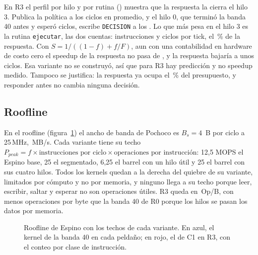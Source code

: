 \begin{table}[H]\centering
\caption{Speedup predicho por Amdahl contra el medido, con la banda 40.}\label{tab:amdahl}

\end{table}

En R3 el perfil por hilo y por rutina () muestra que la respuesta la cierra el hilo 3. Publica la política a los \ctresHitoPolProm{} ciclos en promedio, y el hilo 0, que terminó la banda 40 antes y esperó \ctresEsperaHiloCero{} ciclos, escribe \texttt{DECISION} a los \ctresHitoDecProm. Lo que más pesa en el hilo 3 es la rutina \texttt{ejecutar}, las dos cuentas: \ctresEjecutarIc{} instrucciones y \ctresEjecutarCiclos{} ciclos por tick, el \ctresAmdahlF\,\% de la respuesta. Con $S = 1/((1-f) + f/F)$, aun con una contabilidad en hardware de costo cero el speedup de la respuesta no pasa de \ctresAmdahlSmax, y la respuesta bajaría a unos \ctresAmdahlRespMin{} ciclos. Esa variante no se construyó, así que para R3 hay predicción y no speedup medido. Tampoco se justifica: la respuesta ya ocupa el \ctresUsoPresupuesto\,\% del presupuesto, y responder antes no cambia ninguna decisión.

\subsection{Roofline}

En el roofline (figura~\ref{fig:roofline}) el ancho de banda de Pochoco es $B_s = 4$~B por ciclo a 25\,MHz, \pSieteBs\,MB/s. Cada variante tiene su techo $P_{peak} = f \times \text{instrucciones por ciclo} \times \text{operaciones por instrucción}$: 12,5 MOPS el Espino base, 25 el segmentado, 6,25 el barrel con un hilo útil y 25 el barrel con sus cuatro hilos. Todos los kernels quedan a la derecha del quiebre de su variante, limitados por cómputo y no por memoria, y ninguno llega a su techo porque leer, escribir, saltar y esperar no son operaciones útiles. R3 queda en \ctresIntensidad\,Op/B, con menos operaciones por byte que la banda 40 de R0 porque los hilos se pasan los datos por memoria.

\begin{figure}[H]\centering
\resizebox{0.68\linewidth}{!}{}
\caption{Roofline de Espino con los techos de cada variante. En azul, el kernel de la banda 40 en cada peldaño; en rojo, el de C1 en R3, con el conteo por clase de instrucción.}\label{fig:roofline}
\end{figure}


